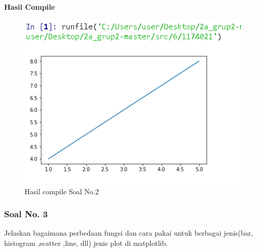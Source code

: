 

\hfill \break
\textbf{Hasil Compile}

\begin{figure}[H]
	\includegraphics{figures/6/1174021/2.png}
	\centering
	\caption{Hasil compile Soal No.2}
\end{figure}
 
\subsubsection{Soal No. 3}
\hfill \break
Jelaskan bagaimana perbedaan fungsi dan cara pakai untuk berbagai jenis(bar, histogram ,scatter ,line, dll) jenis plot di matplotlib.

